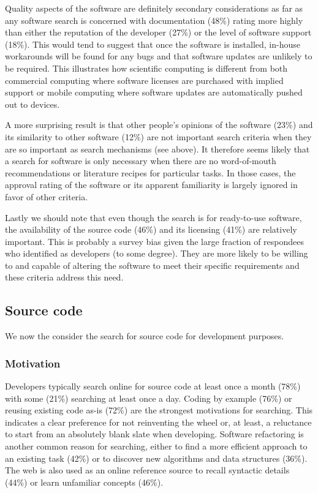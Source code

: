 \documentclass{casicswhitepaper}
\begin{document}
Quality aspects of the software are definitely secondary considerations as far as any software search is concerned with documentation (48\%) rating more highly than either the reputation of the developer (27\%) or the level of software support (18\%). This would tend to suggest that once the software is installed, in-house workarounds will be found for any bugs and that software updates are unlikely to be required. This illustrates how scientific computing is different from both commercial computing where software licenses are purchased with implied support or mobile computing where software updates are automatically pushed out to devices. 

A more surprising result is that other people's opinions of the software (23\%) and its similarity to other software (12\%) are not important search criteria when they are so important as search mechanisms (see above). It therefore seems likely that a search for software is only necessary when there are no word-of-mouth recommendations or literature recipes for particular tasks. In those cases, the approval rating of the software or its apparent familiarity is largely ignored in favor of other criteria.

Lastly we should note that even though the search is for ready-to-use software, the availability of the source code (46\%) and its licensing (41\%) are relatively important. This is probably a survey bias given the large fraction of respondees who identified as developers (to some degree). They are more likely to be willing to and capable of altering the software to meet their specific requirements and these criteria address this need.

\subsection{Source code}

We now the consider the search for source code for development purposes.

\subsubsection{Motivation}

Developers typically search online for source code at least once a month (78\%) with some (21\%) searching at least once a day. Coding by example (76\%) or reusing existing code as-is (72\%) are the strongest motivations for searching. This indicates a clear preference for not reinventing the wheel or, at least, a reluctance to start from an absolutely blank slate when developing. Software refactoring is another common reason for searching, either to find a more efficient approach to an existing task (42\%) or to discover new algorithms and data structures (36\%). The web is also used as an online reference source to recall syntactic details (44\%) or learn unfamiliar concepts (46\%). 
\end{document}
